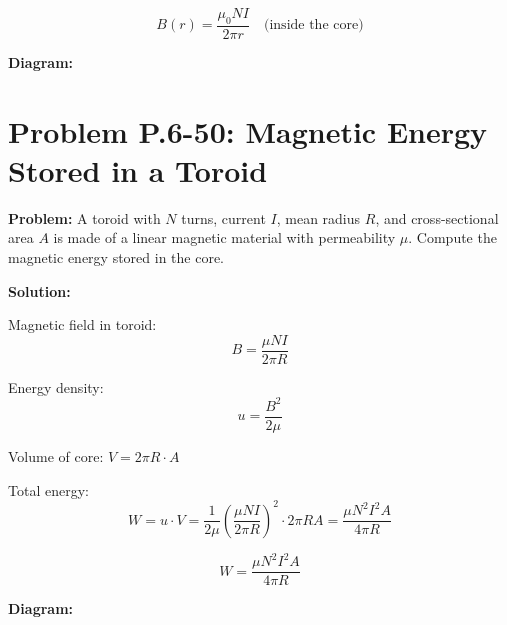\documentclass[12pt]{article}
\begin{document}
\begin{tcolorbox}
\[
\boxed{B(r) = \frac{\mu_0 N I}{2\pi r}} \quad \text{(inside the core)}
\]
\end{tcolorbox}

\textbf{Diagram:}
\begin{center}
\end{center}



\section*{Problem P.6-50: Magnetic Energy Stored in a Toroid}

\textbf{Problem:}  
A toroid with \( N \) turns, current \( I \), mean radius \( R \), and cross-sectional area \( A \) is made of a linear magnetic material with permeability \( \mu \). Compute the magnetic energy stored in the core.

\textbf{Solution:}

Magnetic field in toroid:
\[
B = \frac{\mu N I}{2\pi R}
\]

Energy density:
\[
u = \frac{B^2}{2\mu}
\]

Volume of core: \( V = 2\pi R \cdot A \)

Total energy:
\[
W = u \cdot V = \frac{1}{2\mu} \left( \frac{\mu N I}{2\pi R} \right)^2 \cdot 2\pi R A
= \frac{\mu N^2 I^2 A}{4\pi R}
\]

\begin{tcolorbox}
\[
\boxed{W = \frac{\mu N^2 I^2 A}{4\pi R}}
\]
\end{tcolorbox}

\textbf{Diagram:}
\begin{center}
\end{center}
\end{document}
